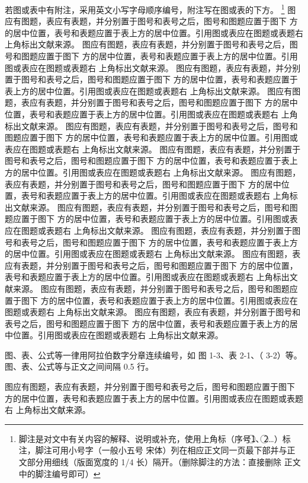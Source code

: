 \documentclass[]{template}
\begin{document}
    若图或表中有附注，采用英文小写字母顺序编号，附注写在图或表的下方。 \footnote{脚注是对文中有关内容的解释、说明或补充，使用上角标（序号\textcircled{1}、\textcircled{2}…）标注，脚注可用小号字（一般小五号 宋体）列在相应正文同一页最下部并与正文部分用细线（版面宽度的 1/4 长）隔开。（删除脚注的方法：直接删除 正文中的脚注编号即可） }
    图应有图题，表应有表题，并分别置于图号和表号之后，图号和图题应置于图下 方的居中位置，表号和表题应置于表上方的居中位置。引用图或表应在图题或表题右 上角标出文献来源。 图应有图题，表应有表题，并分别置于图号和表号之后，图号和图题应置于图下 方的居中位置，表号和表题应置于表上方的居中位置。引用图或表应在图题或表题右 上角标出文献来源。 图应有图题，表应有表题，并分别置于图号和表号之后，图号和图题应置于图下 方的居中位置，表号和表题应置于表上方的居中位置。引用图或表应在图题或表题右 上角标出文献来源。 图应有图题，表应有表题，并分别置于图号和表号之后，图号和图题应置于图下 方的居中位置，表号和表题应置于表上方的居中位置。引用图或表应在图题或表题右 上角标出文献来源。 图应有图题，表应有表题，并分别置于图号和表号之后，图号和图题应置于图下 方的居中位置，表号和表题应置于表上方的居中位置。引用图或表应在图题或表题右 上角标出文献来源。 图应有图题，表应有表题，并分别置于图号和表号之后，图号和图题应置于图下 方的居中位置，表号和表题应置于表上方的居中位置。引用图或表应在图题或表题右 上角标出文献来源。 图应有图题，表应有表题，并分别置于图号和表号之后，图号和图题应置于图下 方的居中位置，表号和表题应置于表上方的居中位置。引用图或表应在图题或表题右 上角标出文献来源。 图应有图题，表应有表题，并分别置于图号和表号之后，图号和图题应置于图下 方的居中位置，表号和表题应置于表上方的居中位置。引用图或表应在图题或表题右 上角标出文献来源。 图应有图题，表应有表题，并分别置于图号和表号之后，图号和图题应置于图下 方的居中位置，表号和表题应置于表上方的居中位置。引用图或表应在图题或表题右 上角标出文献来源。 图应有图题，表应有表题，并分别置于图号和表号之后，图号和图题应置于图下 方的居中位置，表号和表题应置于表上方的居中位置。引用图或表应在图题或表题右 上角标出文献来源。 图应有图题，表应有表题，并分别置于图号和表号之后，图号和图题应置于图下 方的居中位置，表号和表题应置于表上方的居中位置。引用图或表应在图题或表题右 上角标出文献来源。 图应有图题，表应有表题，并分别置于图号和表号之后，图号和图题应置于图下 方的居中位置，表号和表题应置于表上方的居中位置。引用图或表应在图题或表题右 上角标出文献来源。 
\newpage

图、表、公式等一律用阿拉伯数字分章连续编号，如 图 1-3、表 2-1、（ 3-2）等。 图、表、公式等与正文之间间隔 0.5 行。 

图应有图题，表应有表题，并分别置于图号和表号之后，图号和图题应置于图下 方的居中位置，表号和表题应置于表上方的居中位置。引用图或表应在图题或表题右 上角标出文献来源。 
\end{document}
